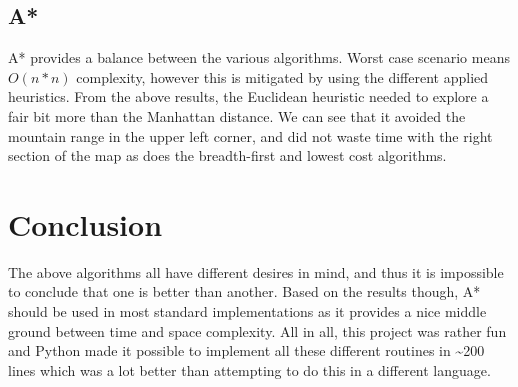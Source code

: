 \documentclass[11pt,letterpaper]{article}
\begin{document}
\subsection{A*}
A* provides a balance between the various algorithms.
Worst case scenario means $O(n*n)$ complexity, however this is mitigated by using the different applied heuristics.
From the above results, the Euclidean heuristic needed to explore a fair bit more than the Manhattan distance.
We can see that it avoided the mountain range in the upper left corner, and did not waste time with the right section of the map as does the breadth-first and lowest cost algorithms.

\section{Conclusion}
The above algorithms all have different desires in mind, and thus it is impossible to conclude that one is better than another.
Based on the results though, A* should be used in most standard implementations as it provides a nice middle ground between time and space complexity.
All in all, this project was rather fun and Python made it possible to implement all these different routines in \textasciitilde200 lines which was a lot better than attempting to do this in a different language.

\clearpage

\end{document}
